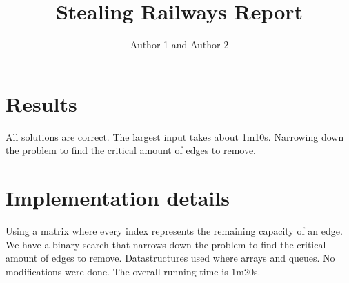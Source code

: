 \documentclass{article}
\title{Stealing Railways Report}
\author{Author 1 and Author 2}
\begin{document}
  \maketitle

  \section{Results}

                All solutions are correct.
                The largest input takes about 1m10s.
                Narrowing down the problem to find the critical amount of edges to remove.

  \section{Implementation details}


                Using a matrix where every index represents the remaining capacity of an edge. We have a binary 
                search that narrows down the problem to find the critical amount of edges to remove. 
                Datastructures used where arrays and queues. No modifications were done.
                The overall running time is 1m20s. 
\end{document}
